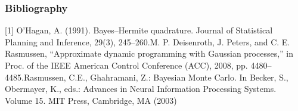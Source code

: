 \documentclass[9pt]{beamer}
\begin{document}
\begin{frame}
\frametitle{Bibliography}
[1] O’Hagan, A. (1991). Bayes–Hermite quadrature. Journal of Statistical Planning and Inference, 29(3), 245–260.\newline
[2]   M.  P.  Deisenroth,  J.  Peters,  and  C.  E.  Rasmussen,  “Approximate dynamic programming with Gaussian processes,” in Proc. of the IEEE American Control Conference (ACC), 2008, pp. 4480–4485.\newline
[3] Rasmussen, C.E., Ghahramani, Z.: Bayesian Monte Carlo. In Becker, S., Obermayer, K., eds.: Advances in Neural Information Processing Systems. Volume 15. MIT Press, Cambridge, MA (2003)
\end{frame}

 
\end{document}
